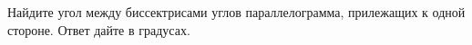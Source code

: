 \begin{ex}
	\begin{condition}
		Найдите угол между биссектрисами углов параллелограмма, прилежащих к одной стороне. Ответ дайте в градусах.
	\end{condition}
\end{ex}